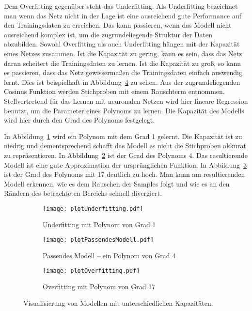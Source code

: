 Dem Overfitting gegenüber steht das Underfitting. 
Als Underfitting bezeichnet man wenn das Netz nicht in der Lage ist
eine ausreichend gute Performance auf den Trainingsdaten zu erreichen.
Das kann passieren, wenn das Modell nicht ausreichend komplex ist, um die zugrundeliegende Struktur der Daten abzubilden.
Sowohl Overfitting als auch Underfitting hängen mit der Kapazität eines Netzes zusammen.
Ist die Kapazität zu gering, kann es sein, dass das Netz daran scheitert die Trainingsdaten zu lernen.
Ist die Kapazität zu groß, so kann es passieren, dass das Netz gewissermaßen die Trainingsdaten einfach auswendig lernt.
Dies ist beispielhaft in Abbildung~\ref{fig:capacity} zu sehen.
Aus der zugrundeliegenden Cosinus Funktion werden Stichproben mit einem Rauschterm entnommen. 
Stellvertretend für das Lernen mit neuronalen Netzen wird hier lineare Regression benutzt,
um die Parameter eines Polynoms zu lernen.
Die Kapazität des Modells wird hier durch den Grad des Polynoms festgelegt.

In Abbildung~\ref{subfig:underfitting} wird ein Polynom mit dem Grad 1 gelernt.
Die Kapazität ist zu niedrig und dementsprechend schafft das Modell es nicht die Stichproben akkurat zu repräsentieren.
In Abbildung~\ref{subfig:rightfitting} ist der Grad des Polynoms 4.
Das resultierende Modell ist eine gute Approximation der ursprünglichen Funktion.
In Abbildung~\ref{subfig:overfitting} ist der Grad des Polynoms mit 17 deutlich zu hoch.
Man kann am resultierenden Modell erkennen, wie es dem Rauschen der Samples folgt und wie es an den Rändern des betrachteten Bereichs schnell divergiert.

\begin{figure}[p]
    \centering
	
	\begin{subfigure}[t]{0.6\textwidth}
		\texttt{[image: plotUnderfitting.pdf]}
		\caption{Underfitting mit Polynom von Grad 1}
		\label{subfig:underfitting}
	\end{subfigure}
	\begin{subfigure}[t]{0.6\textwidth}
		\texttt{[image: plotPassendesModell.pdf]}
		\caption{Passendes Modell -- ein Polynom von Grad 4}
		\label{subfig:rightfitting}
	\end{subfigure}
	\begin{subfigure}[t]{0.6\textwidth}
        \texttt{[image: plotOverfitting.pdf]}
		\caption{Overfitting mit Polynom von Grad 17}
		\label{subfig:overfitting}
	\end{subfigure}
	\caption{Visualisierung von Modellen mit unterschiedlichen Kapazitäten.}
	\label{fig:capacity}
\end{figure}

